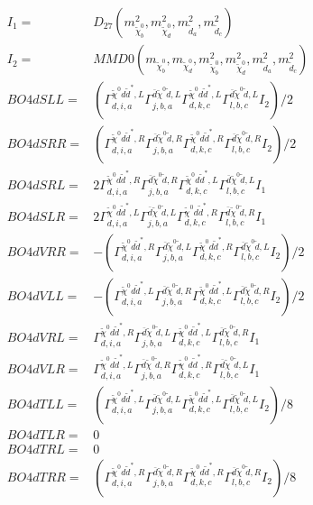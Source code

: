 \documentclass[A4,landscape]{article}
\begin{document}
\begin{align} 
I_1 = & D_{27}(m^2_{\tilde{\chi}^0_{{b}}}, m^2_{\tilde{\chi}^0_{{d}}}, m^2_{\tilde{d}_{{a}}}, m^2_{\tilde{d}_{{c}}}) \\ 
I_2 = & MMD0(m_{\tilde{\chi}^0_{{b}}}, m_{\tilde{\chi}^0_{{d}}}, m^2_{\tilde{\chi}^0_{{b}}}, m^2_{\tilde{\chi}^0_{{d}}}, m^2_{\tilde{d}_{{a}}}, m^2_{\tilde{d}_{{c}}}) \\ 
  BO4dSLL= & ( \Gamma^{\tilde{\chi}^0 d \tilde{d}^*,L}_{d, i, a} \Gamma^{\bar{d}\tilde{\chi}^0 \tilde{d} ,L}_{j, b, a} \Gamma^{\tilde{\chi}^0 d \tilde{d}^*,L}_{d, k, c} \Gamma^{\bar{d}\tilde{\chi}^0 \tilde{d} ,L}_{l, b, c} I_2)/2 \\ 
  BO4dSRR= & ( \Gamma^{\tilde{\chi}^0 d \tilde{d}^*,R}_{d, i, a} \Gamma^{\bar{d}\tilde{\chi}^0 \tilde{d} ,R}_{j, b, a} \Gamma^{\tilde{\chi}^0 d \tilde{d}^*,R}_{d, k, c} \Gamma^{\bar{d}\tilde{\chi}^0 \tilde{d} ,R}_{l, b, c} I_2)/2 \\ 
  BO4dSRL= & 2  \Gamma^{\tilde{\chi}^0 d \tilde{d}^*,R}_{d, i, a} \Gamma^{\bar{d}\tilde{\chi}^0 \tilde{d} ,R}_{j, b, a} \Gamma^{\tilde{\chi}^0 d \tilde{d}^*,L}_{d, k, c} \Gamma^{\bar{d}\tilde{\chi}^0 \tilde{d} ,L}_{l, b, c} I_1 \\ 
  BO4dSLR= & 2  \Gamma^{\tilde{\chi}^0 d \tilde{d}^*,L}_{d, i, a} \Gamma^{\bar{d}\tilde{\chi}^0 \tilde{d} ,L}_{j, b, a} \Gamma^{\tilde{\chi}^0 d \tilde{d}^*,R}_{d, k, c} \Gamma^{\bar{d}\tilde{\chi}^0 \tilde{d} ,R}_{l, b, c} I_1 \\ 
  BO4dVRR= & -( \Gamma^{\tilde{\chi}^0 d \tilde{d}^*,R}_{d, i, a} \Gamma^{\bar{d}\tilde{\chi}^0 \tilde{d} ,L}_{j, b, a} \Gamma^{\tilde{\chi}^0 d \tilde{d}^*,R}_{d, k, c} \Gamma^{\bar{d}\tilde{\chi}^0 \tilde{d} ,L}_{l, b, c} I_2)/2 \\ 
  BO4dVLL= & -( \Gamma^{\tilde{\chi}^0 d \tilde{d}^*,L}_{d, i, a} \Gamma^{\bar{d}\tilde{\chi}^0 \tilde{d} ,R}_{j, b, a} \Gamma^{\tilde{\chi}^0 d \tilde{d}^*,L}_{d, k, c} \Gamma^{\bar{d}\tilde{\chi}^0 \tilde{d} ,R}_{l, b, c} I_2)/2 \\ 
  BO4dVRL= &  \Gamma^{\tilde{\chi}^0 d \tilde{d}^*,R}_{d, i, a} \Gamma^{\bar{d}\tilde{\chi}^0 \tilde{d} ,L}_{j, b, a} \Gamma^{\tilde{\chi}^0 d \tilde{d}^*,L}_{d, k, c} \Gamma^{\bar{d}\tilde{\chi}^0 \tilde{d} ,R}_{l, b, c} I_1 \\ 
  BO4dVLR= &  \Gamma^{\tilde{\chi}^0 d \tilde{d}^*,L}_{d, i, a} \Gamma^{\bar{d}\tilde{\chi}^0 \tilde{d} ,R}_{j, b, a} \Gamma^{\tilde{\chi}^0 d \tilde{d}^*,R}_{d, k, c} \Gamma^{\bar{d}\tilde{\chi}^0 \tilde{d} ,L}_{l, b, c} I_1 \\ 
  BO4dTLL= & ( \Gamma^{\tilde{\chi}^0 d \tilde{d}^*,L}_{d, i, a} \Gamma^{\bar{d}\tilde{\chi}^0 \tilde{d} ,L}_{j, b, a} \Gamma^{\tilde{\chi}^0 d \tilde{d}^*,L}_{d, k, c} \Gamma^{\bar{d}\tilde{\chi}^0 \tilde{d} ,L}_{l, b, c} I_2)/8 \\ 
  BO4dTLR= & 0 \\ 
  BO4dTRL= & 0 \\ 
  BO4dTRR= & ( \Gamma^{\tilde{\chi}^0 d \tilde{d}^*,R}_{d, i, a} \Gamma^{\bar{d}\tilde{\chi}^0 \tilde{d} ,R}_{j, b, a} \Gamma^{\tilde{\chi}^0 d \tilde{d}^*,R}_{d, k, c} \Gamma^{\bar{d}\tilde{\chi}^0 \tilde{d} ,R}_{l, b, c} I_2)/8 \\ 
\end{align} 
\end{document}
